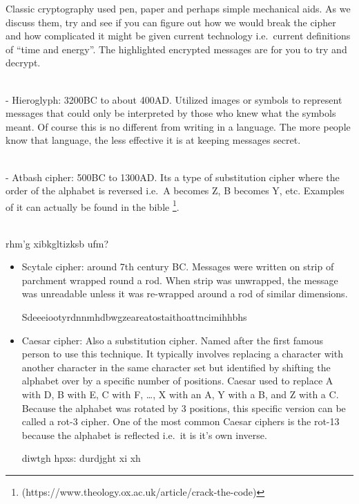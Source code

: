 \documentclass[
  letterpaper,
  DIV=11,
  numbers=noendperiod]{scrartcl}
\newenvironment{Shaded}{\begin{snugshade}}{\end{snugshade}}
\newcommand{\NormalTok}[1]{\textcolor[rgb]{0.00,0.23,0.31}{#1}}
\providecommand{\tightlist}{%
  \setlength{\itemsep}{0pt}\setlength{\parskip}{0pt}}\usepackage{longtable,booktabs,array}
\begin{document}
Classic cryptography used pen, paper and perhaps simple mechanical aids.
As we discuss them, try and see if you can figure out how we would break
the cipher and how complicated it might be given current technology
i.e.~current definitions of ``time and energy''. The highlighted
encrypted messages are for you to try and decrypt.\\
\strut \\
- Hieroglyph: 3200BC to about 400AD. Utilized images or symbols to
represent messages that could only be interpreted by those who knew what
the symbols meant. Of course this is no different from writing in a
language. The more people know that language, the less effective it is
at keeping messages secret.\\
\strut \\
- Atbash cipher: 500BC to 1300AD. Its a type of substitution cipher
where the order of the alphabet is reversed i.e.~A becomes Z, B becomes
Y, etc. Examples of it can actually be found in the bible \footnote{(https://www.theology.ox.ac.uk/article/crack-the-code)}.\\
\strut \\

{rhm'g xibkgltizksb ufm?}

\begin{Shaded}
\end{Shaded}

\begin{itemize}
\tightlist
\item
  Scytale cipher: around 7th century BC. Messages were written on strip
  of parchment wrapped round a rod. When strip was unwrapped, the
  message was unreadable unless it was re-wrapped around a rod of
  similar dimensions.

  {Sdeeeiootyrdnnmhdbwgzeareatostaithoattncimihhbhs}
\item
  Caesar cipher: Also a substitution cipher. Named after the first
  famous person to use this technique. It typically involves replacing a
  character with another character in the same character set but
  identified by shifting the alphabet over by a specific number of
  positions. Caesar used to replace A with D, B with E, C with F,
  \ldots, X with an A, Y with a B, and Z with a C. Because the alphabet
  was rotated by 3 positions, this specific version can be called a
  rot-3 cipher. One of the most common Caesar ciphers is the rot-13
  because the alphabet is reflected i.e.~it is it's own inverse.

  {diwtgh hpxs: durdjght xi xh}
\end{itemize}
\end{document}

